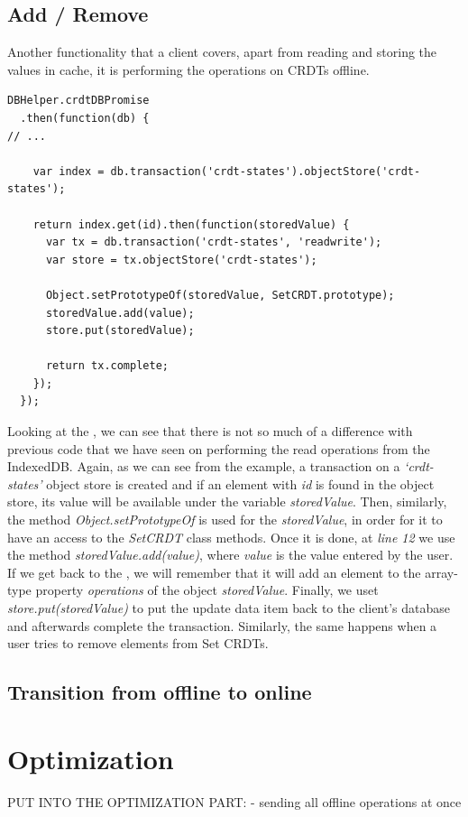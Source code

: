 \subsection*{Add / Remove}

Another functionality that a client covers, apart from reading and storing the values in cache, it is performing the operations on CRDTs offline.

\begin{lstlisting}[caption={Reading CRDT states from client's cache.}, label={lst:dev11}]
DBHelper.crdtDBPromise
  .then(function(db) {
// ...

    var index = db.transaction('crdt-states').objectStore('crdt-states');

    return index.get(id).then(function(storedValue) {
      var tx = db.transaction('crdt-states', 'readwrite');
      var store = tx.objectStore('crdt-states');

      Object.setPrototypeOf(storedValue, SetCRDT.prototype);
      storedValue.add(value);
      store.put(storedValue);

      return tx.complete;
    });
  });
\end{lstlisting}

Looking at the , we can see that there is not so much of a difference with previous code that we have seen on performing the read operations from the IndexedDB. Again, as we can see from the example, a transaction on a \textit{`crdt-states'} object store is created and if an element with \textit{id} is found in the object store, its value will be available under the variable \textit{storedValue}. Then, similarly, the method \textit{Object.setPrototypeOf} is used for the \textit{storedValue}, in order for it to have an access to the \textit{SetCRDT} class methods. Once it is done, at \textit{line 12} we use the method \textit{storedValue.add(value)}, where \textit{value} is the value entered by the user. If we get back to the , we will remember that it will add an element to the array-type property \textit{operations} of the object \textit{storedValue}. Finally, we uset \textit{store.put(storedValue)} to put the update data item back to the client's database and afterwards complete the transaction. Similarly, the same happens when a user tries to remove elements from Set CRDTs.

\subsection*{Transition from offline to online}






\section{Optimization}
PUT INTO THE OPTIMIZATION PART:
- sending all offline operations at once